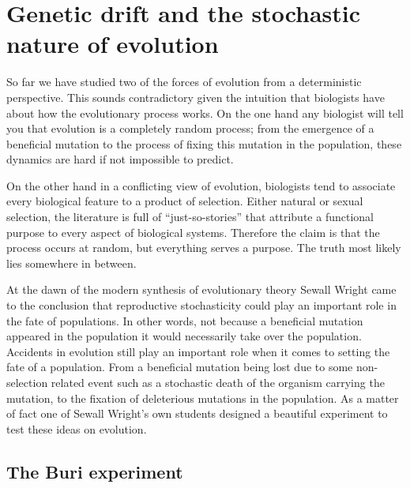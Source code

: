 \section{Genetic drift and the stochastic nature of evolution}

So far we have studied two of the forces of evolution from a deterministic
perspective. This sounds contradictory given the intuition that biologists have
about how the evolutionary process works. On the one hand any biologist will
tell you that evolution is a completely random process; from the emergence of a
beneficial mutation to the process of fixing this mutation in the population,
these dynamics are hard if not impossible to predict.

On the other hand in a conflicting view of evolution, biologists tend to
associate every biological feature to a product of selection. Either natural or
sexual selection, the literature is full of ``just-so-stories'' that attribute
a functional purpose to every aspect of biological systems. Therefore the claim
is that the process occurs at random, but everything serves a purpose. The
truth most likely lies somewhere in between.

At the dawn of the modern synthesis of evolutionary theory Sewall Wright came
to the conclusion that reproductive stochasticity could play an important role
in the fate of populations. In other words, not because a beneficial mutation
appeared in the population it would necessarily take over the population.
Accidents in evolution still play an important role when it comes to setting
the fate of a population. From a beneficial mutation being lost due to some
non-selection related event such as a stochastic death of the organism carrying
the mutation, to the fixation of deleterious mutations in the population. As a
matter of fact one of Sewall Wright's own students designed a beautiful
experiment to test these ideas on evolution.

\subsection{The Buri experiment}


